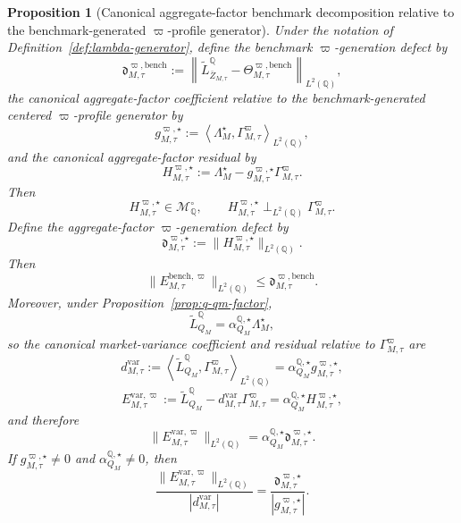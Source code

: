 \documentclass[11pt,a4paper]{amsart}
\theoremstyle{plain}
\newtheorem{proposition}[theorem]{Proposition}
\theoremstyle{definition}
\theoremstyle{remark}
\newcommand{\QQ}{\mathbb{Q}}
\newcommand{\cM}{\mathcal{M}}
\begin{document}
\begin{proposition}[Canonical aggregate-factor benchmark decomposition relative to the benchmark-generated \(\varpi\)-profile generator]\label{prop:lambda-generator-qm}
Under the notation of Definition~\ref{def:lambda-generator}, define the benchmark
\(\varpi\)-generation defect by
\[
        \mathfrak d_{M,\tau}^{\varpi,\mathrm{bench}}
        :=
        \left\|
                \widetilde L_{\bar Z_{M,\tau}}^\QQ
                -
                \Theta_{M,\tau}^{\varpi,\mathrm{bench}}
        \right\|_{L^2(\QQ)},
\]
the canonical aggregate-factor coefficient relative to the benchmark-generated centered
\(\varpi\)-profile generator by
\[
        g_{M,\tau}^{\varpi,\star}
        :=
        \left\langle
                \Lambda_M^\star,
                \Gamma_{M,\tau}^\varpi
        \right\rangle_{L^2(\QQ)},
\]
and the canonical aggregate-factor residual by
\[
        H_{M,\tau}^{\varpi,\star}
        :=
        \Lambda_M^\star
        -
        g_{M,\tau}^{\varpi,\star}\Gamma_{M,\tau}^\varpi.
\]
Then
\[
        H_{M,\tau}^{\varpi,\star}\in \cM_\QQ^\circ,
        \qquad
        H_{M,\tau}^{\varpi,\star}
        \perp_{L^2(\QQ)}
        \Gamma_{M,\tau}^\varpi.
\]
Define the aggregate-factor \(\varpi\)-generation defect by
\[
        \mathfrak d_{M,\tau}^{\varpi,\star}
        :=
        \|H_{M,\tau}^{\varpi,\star}\|_{L^2(\QQ)}.
\]
Then
\[
        \|E_{M,\tau}^{\mathrm{bench},\varpi}\|_{L^2(\QQ)}
        \le
        \mathfrak d_{M,\tau}^{\varpi,\mathrm{bench}}.
\]
Moreover, under Proposition~\ref{prop:q-qm-factor},
\[
        \widetilde L_{Q_M}^\QQ
        =
        \alpha_{Q_M}^{\QQ,\star}\Lambda_M^\star,
\]
so the canonical market-variance coefficient and residual relative to
\(\Gamma_{M,\tau}^\varpi\) are
\[
        d_{M,\tau}^{\mathrm{var}}
        :=
        \left\langle
                \widetilde L_{Q_M}^\QQ,
                \Gamma_{M,\tau}^\varpi
        \right\rangle_{L^2(\QQ)}
        =
        \alpha_{Q_M}^{\QQ,\star}g_{M,\tau}^{\varpi,\star},
\]
\[
        E_{M,\tau}^{\mathrm{var},\varpi}
        :=
        \widetilde L_{Q_M}^\QQ
        -
        d_{M,\tau}^{\mathrm{var}}\Gamma_{M,\tau}^\varpi
        =
        \alpha_{Q_M}^{\QQ,\star}H_{M,\tau}^{\varpi,\star},
\]
and therefore
\[
        \|E_{M,\tau}^{\mathrm{var},\varpi}\|_{L^2(\QQ)}
        =
        \alpha_{Q_M}^{\QQ,\star}\mathfrak d_{M,\tau}^{\varpi,\star}.
\]
If \(g_{M,\tau}^{\varpi,\star}\neq0\) and \(\alpha_{Q_M}^{\QQ,\star}\neq0\), then
\[
        \frac{\|E_{M,\tau}^{\mathrm{var},\varpi}\|_{L^2(\QQ)}}{|d_{M,\tau}^{\mathrm{var}}|}
        =
        \frac{\mathfrak d_{M,\tau}^{\varpi,\star}}{|g_{M,\tau}^{\varpi,\star}|}.
\]
\end{proposition}
\end{document}
